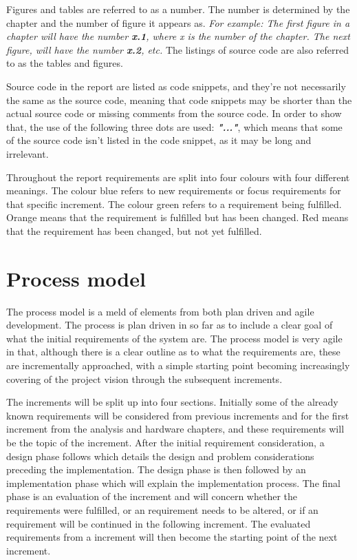 Figures and tables are referred to as a number. The number is determined by the chapter and the number of figure it appears as. \newline
\textit{For example: The first figure in a chapter will have the number \textbf{x.1}, where x is the number of the chapter. The next figure, will have the number \textbf{x.2}, etc.}
\newline
The listings of source code are also referred to as the tables and figures. 

Source code in the report are listed as code snippets, and they're not necessarily the same as the source code, meaning that code snippets may be shorter than the actual source code or missing comments from the source code. In order to show that, the use of the following three dots are used: \textit\textbf{{"..."}}, which means that some of the source code isn't listed in the code snippet, as it may be long and irrelevant. 

Throughout the report requirements are split into four colours with four different meanings. The colour blue refers to new requirements or focus requirements for that specific increment. The colour green refers to a requirement being fulfilled. Orange means that the requirement is fulfilled but has been changed. Red means that the requirement has been changed, but not yet fulfilled. 


\chapter*{Process model}
The process model is a meld of elements from both plan driven and agile development. The process is plan driven in so far as to include a clear goal of what the initial requirements of the system are. The process model is very agile in that, although there is a clear outline as to what the requirements are, these are incrementally approached, with a simple starting point becoming increasingly covering of the project vision through the subsequent increments.

The increments will be split up into four sections. Initially some of the already known requirements will be considered from previous increments and for the first increment from the analysis and hardware chapters, and these requirements will be the topic of the increment.
After the initial requirement consideration, a design phase follows which details the design and problem considerations preceding the implementation. The design phase is then followed by an implementation phase which will explain the implementation process. The final phase is an evaluation of the increment and will concern whether the requirements were fulfilled, or an requirement needs to be altered, or if an requirement will be continued in the following increment. The evaluated requirements from a increment will then become the starting point of the next increment. 


